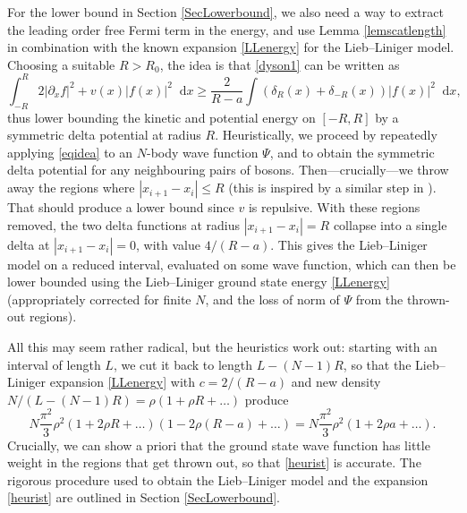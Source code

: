\documentclass[a4paper,11pt]{article}
\newcommand*\diff{\mathop{}\!\mathrm{d}}
\numberwithin{equation}{section}
\begin{document}
For the lower bound in Section \ref{SecLowerbound}, we also need a way to extract the leading order free Fermi term in the energy, and use Lemma \ref{lemscatlength} in combination with the known expansion \eqref{LLenergy} for the Lieb--Liniger model. Choosing a suitable $R>R_0$, the idea is that \eqref{dyson1} can be written as 
\begin{equation}
\label{eqidea}
\int^{R}_{-R}2|\partial_x f|^2+v(x)|f(x)|^2\diff x\geq \frac{2}{R-a}\int (\delta_{R}(x)+\delta_{-{R}}(x))|f(x)|^2\diff x,
\end{equation}
thus lower bounding the kinetic and potential energy on $[-R,R]$ by a symmetric delta potential at radius $R$. Heuristically, we proceed by repeatedly applying \eqref{eqidea} to an $N$-body wave function $\Psi$, and to obtain the symmetric delta potential for any neighbouring pairs of bosons. Then---crucially---we throw away the regions where $|x_{i+1}-x_i|\leq R$ (this is inspired by a similar step in \cite{lieb2004one}). That should produce a lower bound since $v$ is repulsive. With these regions removed, the two delta functions at radius $|x_{i+1}-x_i|= R$ collapse into a single delta at $|x_{i+1}-x_i|= 0$, with value $4/(R-a)$. This gives the Lieb--Liniger model on a reduced interval, evaluated on some wave function, which can then be lower bounded using the Lieb--Liniger ground state energy  \eqref{LLenergy} (appropriately corrected for finite $N$, and the loss of norm of $\Psi$ from the thrown-out regions). 

All this may seem rather radical, but the heuristics work out: starting with an interval of length $L$, we cut it back to length $L-(N-1)R$, so that the Lieb--Liniger expansion \eqref{LLenergy} with $c=2/(R-a)$ and new density $N/(L-(N-1)R)=\rho(1+\rho R+\dots)$ produce
\begin{equation}
\label{heurist}
N\frac{\pi^2}{3}\rho^2(1+2\rho R+\dots)(1-2\rho(R-a)+\dots)=N\frac{\pi^2}{3}\rho^2(1+2\rho a+\dots).
\end{equation}
Crucially, we can show a priori that the ground state wave function has little weight in the regions that get thrown out, so that \eqref{heurist} is accurate. The rigorous procedure used to obtain the Lieb--Liniger model and the expansion \eqref{heurist} are outlined in Section \ref{SecLowerbound}. 
\end{document}
